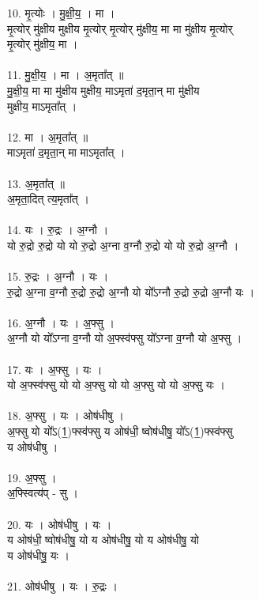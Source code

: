 10. मृ॒त्योः । मु॒क्षी॒य॒ । मा ।\\
मृ॒त्योर् मु॑क्षीय मुक्षीय मृ॒त्योर् मृ॒त्योर् मु॑क्षीय॒ मा मा मु॑क्षीय मृ॒त्योर्\\
मृ॒त्योर् मु॑क्षीय॒ मा ।\\
\\
11. मु॒क्षी॒य॒ । मा । अ॒मृता᳚त् ॥\\
मु॒क्षी॒य॒ मा मा मु॑क्षीय मुक्षीय॒ माऽमृता॑ द॒मृता॒न् मा मु॑क्षीय\\
मुक्षीय॒ माऽमृता᳚त् ।\\
\\
12. मा । अ॒मृता᳚त् ॥\\
माऽमृता॑ द॒मृता॒न् मा माऽमृता᳚त् ।\\
\\
13. अ॒मृता᳚त् ॥\\
अ॒मृता॒दित् त्य॒मृता᳚त् ।\\
\\
14. यः । रु॒द्रः । अ॒ग्नौ ।\\
यो रु॒द्रो रु॒द्रो यो यो रु॒द्रो अ॒ग्ना व॒ग्नौ रु॒द्रो यो यो रु॒द्रो अ॒ग्नौ ।\\
\\
15. रु॒द्रः । अ॒ग्नौ । यः ।\\
रु॒द्रो अ॒ग्ना व॒ग्नौ रु॒द्रो रु॒द्रो अ॒ग्नौ यो यो᳚ऽग्नौ रु॒द्रो रु॒द्रो अ॒ग्नौ यः ।\\
\\
16. अ॒ग्नौ । यः । अ॒फ्सु ।\\
अ॒ग्नौ यो यो᳚ऽग्ना व॒ग्नौ यो अ॒फ्स्व॑फ्सु यो᳚ऽग्ना व॒ग्नौ यो अ॒फ्सु ।\\
\\
17. यः । अ॒फ्सु । यः ।\\
यो अ॒फ्स्व॑फ्सु यो यो अ॒फ्सु यो यो अ॒फ्सु यो यो अ॒फ्सु यः ।\\
\\
18. अ॒फ्सु । यः । ओष॑धीषु ।\\
अ॒फ्सु यो यो᳚ऽ(1॒)फ्स्व॑फ्सु य ओष॑धी॒ ष्वोष॑धीषु॒ यो᳚ऽ(1॒)फ्स्व॑फ्सु\\
य ओष॑धीषु ।\\
\\
19. अ॒फ्सु ।\\
अ॒फ्स्वित्य॑प् - सु ।\\
\\
20. यः । ओष॑धीषु । यः ।\\
य ओष॑धी॒ ष्वोष॑धीषु॒ यो य ओष॑धीषु॒ यो य ओष॑धीषु॒ यो\\
य ओष॑धीषु॒ यः ।\\
\\
21. ओष॑धीषु । यः । रु॒द्रः ।\\

